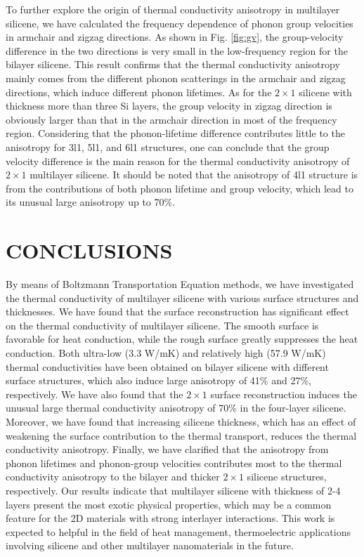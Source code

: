\documentclass[aps,prb,twocolumn,showpacs,amsmath,amssymb]{revtex4-1}
\begin{document}
To further explore the origin of thermal conductivity anisotropy in multilayer silicene, we have calculated the frequency dependence of phonon group velocities in armchair and zigzag directions. As shown in Fig. \ref{fig:gv},  the group-velocity difference in the two directions is very small in the low-frequency region for the bilayer silicene. This result confirms that the thermal conductivity anisotropy mainly comes from the different phonon scatterings in the armchair and zigzag directions,  which induce different phonon lifetimes.
As for the $2\times 1$ silicene with thickness more than three Si layers,  the group velocity in zigzag direction is obviously larger than that in the armchair direction in most of the frequency region. Considering that the phonon-lifetime difference contributes little to the anisotropy for 3l1, 5l1, and 6l1 structures, one can conclude that the group velocity difference is the main reason for the thermal conductivity anisotropy of $2\times 1$ multilayer silicene. It should be noted that the anisotropy of 4l1 structure is from the contributions of both phonon lifetime and group velocity, which lead to its unusual large anisotropy up to 70\%.

\section{CONCLUSIONS}
By means of Boltzmann Transportation Equation methods, we have investigated the thermal conductivity of multilayer silicene with various surface structures and thicknesses.
We have found that the surface reconstruction has significant effect on the thermal conductivity of multilayer silicene.  The smooth surface is favorable for heat conduction, while the rough surface greatly suppresses the heat conduction. Both ultra-low (3.3 W/mK) and relatively high (57.9 W/mK) thermal conductivities have been obtained on bilayer silicene with different surface structures, which also induce large anisotropy of 41\% and 27\%, respectively. We have also found that the $2 \times 1$ surface reconstruction induces the unusual large thermal conductivity anisotropy of 70\%  in the four-layer silicene.  Moreover, we have found that increasing silicene thickness, which has an effect of weakening the surface contribution to the thermal transport, reduces the thermal conductivity anisotropy. Finally, we have clarified that the anisotropy from phonon lifetimes and phonon-group velocities contributes most to the thermal conductivity anisotropy to the bilayer and thicker $2\times 1$ silicene structures, respectively. Our results indicate that multilayer silicene with thickness of 2-4 layers present the most exotic physical properties, which may be a common feature for the 2D materials with strong interlayer interactions.
This work is expected to helpful in the field of heat management, thermoelectric applications involving silicene and other multilayer nanomaterials in the future.
\end{document}

